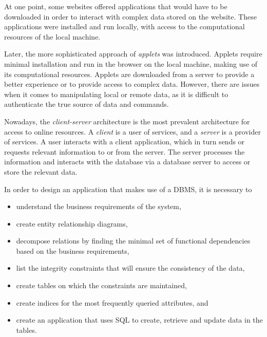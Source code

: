 At one point, some websites offered applications that would have to be downloaded in order to interact with complex data stored on the website.
These applications were installed and run locally, with access to the computational resources of the local machine.

Later, the more sophisticated approach of \emph{applets} was introduced.
Applets require minimal installation and run in the browser on the local machine, making use of its computational resources.
Applets are downloaded from a server to provide a better experience or to provide access to complex data.
However, there are issues when it comes to manipulating local or remote data, as it is difficult to authenticate the true source of data and commands.

Nowadays, the \emph{client-server} architecture is the most prevalent architecture for access to online resources.
A \emph{client} is a user of services, and a \emph{server} is a provider of services.
A user interacts with a client application, which in turn sends or requests relevant information to or from the server.
The server processes the information and interacts with the database via a database server to access or store the relevant data.

In order to design an application that makes use of a DBMS, it is necessary to
\begin{itemize}
  \item understand the business requirements of the system,
  \item create entity relationship diagrams,
  \item decompose relations by finding the minimal set of functional dependencies based on the business requirements,
  \item list the integrity constraints that will ensure the consistency of the data,
  \item create tables on which the constraints are maintained,
  \item create indices for the most frequently queried attributes, and
  \item create an application that uses SQL to create, retrieve and update data in the tables.
\end{itemize}
